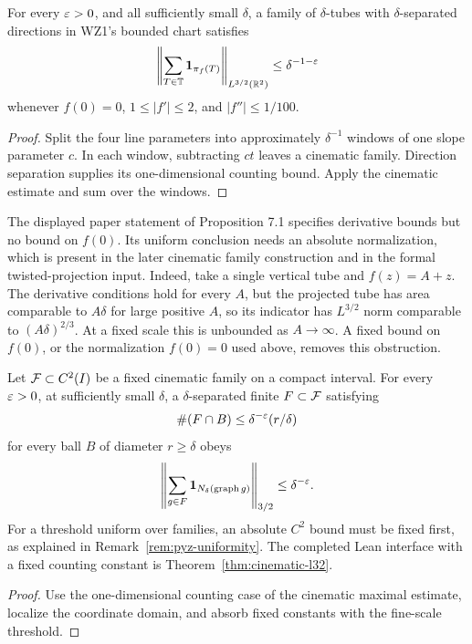 \begin{proposition}
\label{prop:wz1-small-norm}
For every $\varepsilon>0$, and all sufficiently small $\delta$, a family
of $\delta$-tubes with $\delta$-separated directions in WZ1's
bounded chart satisfies
\[
 \left\|\sum_{T\in\mathbb{T}}\mathbf{1}_{\pi_f(T)}\right\|_{L^{3/2}(\mathbb{R}^2)}
                           \leq\delta^{-1-\varepsilon}
\]
whenever $f(0)=0$, $1\leq|f'|\leq2$, and $|f''|\leq1/100$.
\end{proposition}
\begin{proof}
Split the four line parameters into approximately $\delta^{-1}$
windows of one slope parameter $c$. In each window, subtracting
$ct$ leaves a cinematic family. Direction separation supplies its
one-dimensional counting bound. Apply the cinematic estimate and
sum over the windows.
\end{proof}

\begin{remark}
\label{rem:wz1-slope-offset}
The displayed paper statement of Proposition 7.1 specifies derivative
bounds but no bound on $f(0)$. Its uniform conclusion needs an
absolute normalization, which is present in the later cinematic
family construction and in the formal twisted-projection input.
Indeed, take a single vertical tube and $f(z)=A+z$. The derivative
conditions hold for every $A$, but the projected tube has area
comparable to $A\delta$ for large positive $A$, so its indicator has
$L^{3/2}$ norm comparable to $(A\delta)^{2/3}$. At a fixed scale this
is unbounded as $A\to\infty$. A fixed bound on $f(0)$, or the
normalization $f(0)=0$ used above, removes this obstruction.
\end{remark}

\begin{theorem}
\label{thm:wz1-cinematic}
Let $\mathcal{F}\subset C^2(I)$ be a fixed cinematic family on a compact
interval. For every $\varepsilon>0$, at sufficiently small $\delta$, a
$\delta$-separated finite $F\subset\mathcal{F}$ satisfying
\[
              \#(F\cap B)\leq\delta^{-\varepsilon}(r/\delta)
\]
for every ball $B$ of diameter $r\geq\delta$ obeys
\[
               \left\|\sum_{g\in F}\mathbf{1}_{N_\delta(\operatorname{graph} g)}
                    \right\|_{3/2}\leq\delta^{-\varepsilon}.
\]
For a threshold uniform over families, an absolute $C^2$ bound must
be fixed first, as explained in Remark~\ref{rem:pyz-uniformity}.
The completed Lean interface with a fixed counting constant is
Theorem~\ref{thm:cinematic-l32}.
\end{theorem}
\begin{proof}
Use the one-dimensional counting case of the cinematic maximal
estimate, localize the coordinate domain, and absorb fixed constants
with the fine-scale threshold.
\end{proof}

